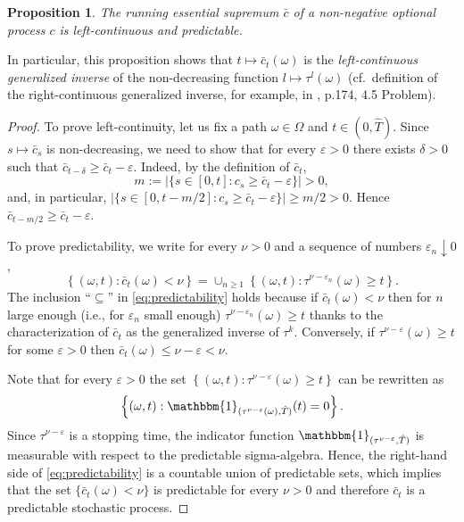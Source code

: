 \documentclass[11pt, oneside]{article}   	%
\theoremstyle{plain}
\newtheorem{prop}[thm]{Proposition}
\theoremstyle{definition}
\theoremstyle{remark}
\begin{document}
\begin{prop}\label{prop:run-sup-properties}
The running essential supremum $\bar{c}$ of a non-negative optional process $c$ is left-continuous and predictable.
\end{prop}
In particular, this proposition shows that $t\mapsto\bar{c}_t(\omega)$ is the \textit{left-continuous generalized inverse} of the non-decreasing function $l\mapsto\tau^l(\omega)$ (cf.~definition of the right-continuous generalized inverse, for example, in \cite{karatzas-shreve-book}, p.174, 4.5 Problem).
\begin{proof}
To prove left-continuity, let us fix a path $\omega\in\Omega$ and $t\in(0,\hat{T})$. Since $s\mapsto\bar{c}_s$ is non-decreasing, we need to show that for every $\varepsilon>0$ there exists $\delta>0$ such that $\bar{c}_{t-\delta}\geq \bar{c}_t-\varepsilon$. Indeed, by the definition of $\bar{c}_t$,
$$m:=\vert\{s\in[0,t]: c_s\geq \bar{c}_t-\varepsilon\}\vert>0,$$
and, in particular, $\vert\{s\in[0,t-m/2]: c_s\geq \bar{c}_t-\varepsilon\}\vert\geq m/2>0$. Hence $\bar{c}_{t-m/2}\geq \bar{c}_t-\varepsilon$.

To prove predictability, we write for every $\nu>0$ and a sequence of numbers $\varepsilon_n\downarrow 0$,
\begin{equation}\label{eq:predictability}
\left\{(\omega,t): \bar{c}_t(\omega)<\nu\right\}=\cup_{n\geq 1}\left\{(\omega,t): \tau^{\nu-\varepsilon_n}(\omega)\geq t\right\}.
\end{equation}
The inclusion ``$\subseteq$'' in \eqref{eq:predictability} holds because if $\bar{c}_t(\omega)<\nu$ then for $n$ large enough (i.e., for $\varepsilon_n$ small enough) $\tau^{\nu-\varepsilon_n}(\omega)\geq t$ thanks to the characterization of $\bar{c}_t$ as the generalized inverse of $\tau^k$. Conversely, if $\tau^{\nu-\varepsilon}(\omega)\geq t$ for some $\varepsilon>0$ then $\bar{c}_t(\omega)\leq\nu-\varepsilon<\nu$.

Note that for every $\varepsilon>0$ the set $\left\{(\omega,t): \tau^{\nu-\varepsilon}(\omega)\geq t\right\}$ can be rewritten as $$\left\{(\omega,t): \mathbbm{1}_{(\tau^{\nu-\varepsilon}(\omega),\hat{T})}(t)=0\right\}.$$
Since $\tau^{\nu-\varepsilon}$ is a stopping time, the indicator function $\mathbbm{1}_{(\tau^{\nu-\varepsilon},\hat{T})}$ is measurable with respect to the predictable sigma-algebra. Hence, the right-hand side of \eqref{eq:predictability} is a countable union of predictable sets, which implies that the set $\{\bar{c}_t(\omega)<\nu\}$ is predictable for every $\nu>0$ and therefore $\bar{c}_t$ is a predictable stochastic process.
\end{proof}
\end{document}

